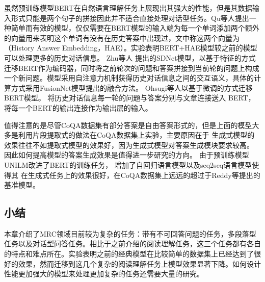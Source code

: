 虽然预训练模型BERT在自然语言理解任务上展现出其强大的性能，但是其数据输入形式只能是两个句子的拼接因此并不适合直接处理对话型任务。Qu等人提出一种简单而有效的模型，仅仅需要在BERT模型的输入端为每一个单词添加两个额外的向量用来表明这个单词有没有在历史答案中出现过，文中称这两个向量为（History Answer Embedding，HAE）。实验表明BERT+HAE模型较之前的模型可以处理更多的历史对话信息。
Zhu等人
提出的SDNet模型，以基于特征的方式迁移BERT作为编码器，同时将之前轮次的问题和答案拼接到当前轮的问题上构成一个新问题。模型采用自注意力机制获得历史对话信息之间的交互语义，具体的计算方式采用FusionNet模型提出的融合方法。
Ohsugi等人以基于微调的方式迁移BERT模型。
将历史对话信息每一轮的问题与答案分别与文章连接送入
BERT，将每一个BERT的输出连接作为输出层的输入。





值得注意的是尽管CoQA数据集有部分答案是自由答案形式的，但是上面的模型大多是利用片段提取式的做法在CoQA数据集上实验，主要原因在于
生成式模型的效果往往不如提取式模型的效果好，因为生成式模型对答案生成模块要求较高。
因此如何提高模型的答案生成效果是值得进一步研究的方向。
由于预训练模型UNILM改进了BERT的训练任务，
增加了自回归语言模型以及seq2seq语言模型使得其
在生成式任务上的效果很好，在CoQA数据集上远远的超过于Reddy等提出的基准模型。

\subsection{小结}
本章介绍了MRC领域目前较为复杂的任务：带有不可回答问题的任务，多段落型任务以及对话型问答任务。相比于之前介绍的阅读理解任务，这三个任务都有各自的特点和难点所在。实验表明之前的经典模型在比较简单的数据集上已经达到了很好的效果，然而迁移到这几个复杂的阅读理解任务上模型效果显著下降。如何设计性能更加强大的模型来处理更加复杂的任务还需要大量的研究。




